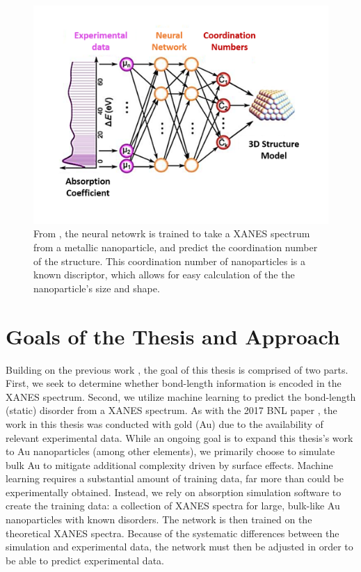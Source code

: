 \begin{figure}[h!]
    \centering
    \includegraphics[width=.75\linewidth]{Chapters/Figures/placeholderFrenkel2017.png}
    \caption[ANN Metallic Nanoparticles]{From \cite{Timoshenko2017}, the neural netowrk is trained to take a XANES spectrum from a metallic nanoparticle, and predict the coordination number of the structure. This coordination number of nanoparticles is a known discriptor, which allows for easy calculation of the the nanoparticle's size and shape.}
\end{figure}

\section{Goals of the Thesis and Approach}
Building on the previous work \cite{Timoshenko2017}, the goal of this thesis is comprised of two parts. First, we seek to determine whether bond-length information is encoded in the XANES spectrum. Second, we utilize machine learning to predict the bond-length (static) disorder from a XANES spectrum. As with the 2017 BNL paper \cite{Timoshenko2017}, the work in this thesis was conducted with gold (Au) due to the availability of relevant experimental data. While an ongoing goal is to expand this thesis's work to Au nanoparticles (among other elements), we primarily choose to simulate bulk Au to mitigate additional complexity driven by surface effects. Machine learning requires a substantial amount of training data, far more than could be experimentally obtained. Instead, we rely on absorption simulation software to create the training data: a collection of XANES spectra for large, bulk-like Au nanoparticles with known disorders. The network is then trained on the theoretical XANES spectra. Because of the systematic differences between the simulation and experimental data, the network must then be adjusted in order to be able to predict experimental data.

